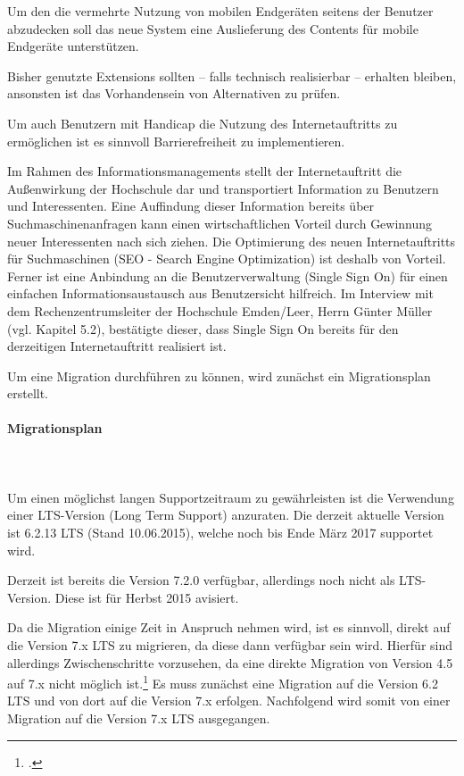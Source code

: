 Um den die vermehrte Nutzung von mobilen Endgeräten seitens der Benutzer abzudecken soll das neue System eine Auslieferung des Contents für mobile Endgeräte unterstützen. 

Bisher genutzte Extensions sollten – falls technisch realisierbar – erhalten bleiben, ansonsten ist das Vorhandensein von Alternativen zu prüfen. 

Um auch Benutzern mit Handicap die Nutzung des Internetauftritts zu ermöglichen ist es sinnvoll Barrierefreiheit zu implementieren. 

Im Rahmen des Informationsmanagements stellt der Internetauftritt die Außenwirkung der Hochschule dar und transportiert Information zu Benutzern und Interessenten. Eine Auffindung dieser Information bereits über Suchmaschinenanfragen kann einen wirtschaftlichen Vorteil durch Gewinnung neuer Interessenten nach sich ziehen. Die Optimierung des neuen Internetauftritts für Suchmaschinen (SEO - Search Engine Optimization) ist deshalb von Vorteil. Ferner ist eine Anbindung an die Benutzerverwaltung (Single Sign On) für einen einfachen Informationsaustausch aus Benutzersicht hilfreich. Im Interview mit dem Rechenzentrumsleiter der Hochschule Emden/Leer, Herrn Günter Müller (vgl. Kapitel 5.2), bestätigte dieser, dass Single Sign On bereits für den derzeitigen Internetauftritt realisiert ist. 

Um eine Migration durchführen zu können, wird zunächst ein Migrationsplan erstellt.

\paragraph{Migrationsplan}\mbox{}\\\\
Um einen möglichst langen Supportzeitraum zu gewährleisten ist die Verwendung einer LTS-Version (Long Term Support) anzuraten. Die derzeit aktuelle Version ist 6.2.13 LTS (Stand 10.06.2015), welche noch bis Ende März 2017 supportet wird.

Derzeit ist bereits die Version 7.2.0 verfügbar, allerdings noch nicht als LTS-Version. Diese ist für Herbst 2015 avisiert. 

Da die Migration einige Zeit in Anspruch nehmen wird, ist es sinnvoll, direkt auf die Version 7.x LTS zu migrieren, da diese dann verfügbar sein wird. Hierfür sind allerdings Zwischenschritte vorzusehen, da eine direkte Migration von Version 4.5 auf 7.x nicht möglich ist.\footcite{typo3_upgrade_url} Es muss zunächst eine Migration auf die Version 6.2 LTS und von dort auf die Version 7.x erfolgen. Nachfolgend wird somit von einer Migration auf die Version 7.x LTS ausgegangen.

